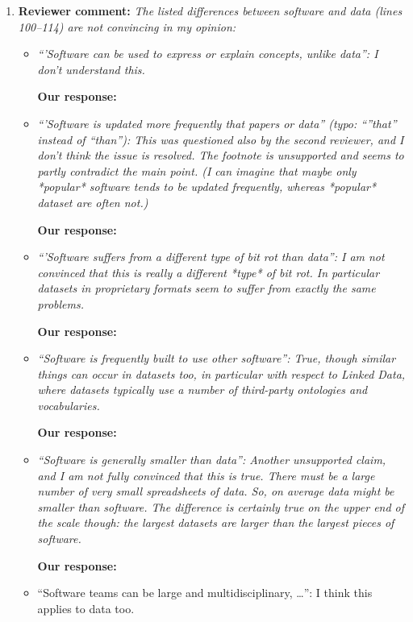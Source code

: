 \documentclass{article}
\begin{document}
\begin{enumerate}

\item \textbf{Reviewer comment:}
\emph{The listed differences between software and data (lines 100--114) are not
convincing in my opinion:}

\begin{itemize}

\item \emph{``'Software can be used to express or explain concepts, unlike
data'': I don't understand this.}

\textbf{Our response:}


\item \emph{``'Software is updated more frequently that papers or data''
(typo: ``''that'' instead of ``than''): This was questioned also by the
second reviewer, and I don't think the issue is resolved. The footnote is
unsupported and seems to partly contradict the main point. (I can imagine that
maybe only *popular* software tends to be updated frequently, whereas
*popular* dataset are often not.)}

\textbf{Our response:}


\item \emph{``'Software suffers from a different type of bit rot than data'':
I am not convinced that this is really a different *type* of bit rot.
In particular datasets in proprietary formats seem to suffer from exactly the
same problems.}

\textbf{Our response:}


\item \emph{``Software is frequently built to use other software'': True,
though similar things can occur in datasets too, in particular with respect to
Linked Data, where datasets typically use a number of third-party ontologies and
vocabularies.}

\textbf{Our response:}


\item \emph{``Software is generally smaller than data'': Another unsupported
claim, and I am not fully convinced that this is true. There must be a large
number of very small spreadsheets of data. So, on average data might be smaller
than software. The difference is certainly true on the upper end of the scale
though: the largest datasets are larger than the largest pieces of software.}

\textbf{Our response:}


\item{``Software teams can be large and multidisciplinary, \ldots'': I think
this applies to data too.}


\end{itemize}
\end{enumerate}
\end{document}
